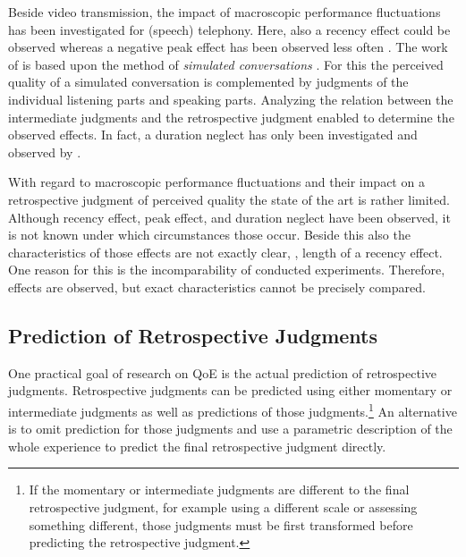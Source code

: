 Beside video transmission, the impact of macroscopic performance fluctuations has been investigated for (speech) telephony. %
Here, also a recency effect could be observed \citep[\eg,][]{rosenbluth_testing_1998, hamberg_time-varying_1999, gros_instantaneous_2001, gros_effects_2004, belmudez_audiovisual_2015, weiss_modeling_2009, lewcio_management_2014} whereas a negative peak effect has been observed less often \citep[\eg,][]{weiss_modeling_2009, belmudez_audiovisual_2015, lewcio_management_2014}.
The work of \citep{weiss_modeling_2009, lewcio_management_2014, belmudez_audiovisual_2015} is based upon the method of \emph{simulated conversations} \citep{etsi_speech_2011}.
For this the perceived quality of a simulated conversation is complemented by judgments of the individual listening parts and speaking parts.
Analyzing the relation between the intermediate judgments and the retrospective judgment enabled to determine the observed effects.
In fact, a duration neglect has only been investigated and observed by \citet{rosenbluth_testing_1998}.

With regard to macroscopic performance fluctuations and their impact on a retrospective judgment of perceived quality the state of the art is rather limited.
Although recency effect, peak effect, and duration neglect have been observed, it is not known under which circumstances those occur.
Beside this also the characteristics of those effects are not exactly clear, \ie, length of a recency effect.
One reason for this is the incomparability of conducted experiments.
Therefore, effects are observed, but exact characteristics cannot be precisely compared.

\subsection{Prediction of Retrospective Judgments}
One practical goal of research on \ac{QoE} is the actual prediction of retrospective judgments.
Retrospective judgments can be predicted using either momentary or intermediate judgments as well as predictions of those judgments.\footnote{If the momentary or intermediate judgments are different to the final retrospective judgment, for example using a different scale or assessing something different, those judgments must be first transformed before predicting the retrospective judgment.}
An alternative is to omit prediction for those judgments and use a parametric description of the whole experience to predict the final retrospective judgment directly.

